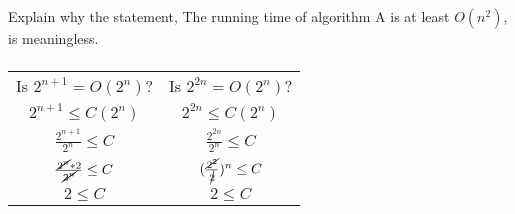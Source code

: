 \documentclass[a4paper,12pt]{article}
\begin{document}
   \subsubsection{} Explain why the statement, The running time of
   algorithm A is at least $O(n^2)$, is meaningless.
    
   \subsubsection{} 
   \begin{center}
   \begin{tabular}{c c}
   Is $2^{n+1} = O(2^n)$? & Is $2^{2n} = O(2^n)$? \\
   $2^{n+1} \leq C(2^n)$  & $2^{2n} \leq C(2^n)$ \\
   $\frac{2^{n+1}}{2^n} \leq C$  & $\frac{2^{2n}}{2^n} \leq C$\\
   $\frac{\cancel{2^n} * 2}{\cancel{2^n}} \leq C$ & $(\frac{\cancel{2^2}}{\cancel{2}})^n \leq C$ \\
   $2 \leq C$ & $2 \leq C$ \\
   \end{tabular}
   \end{center}











    
    
    
\end{document}
